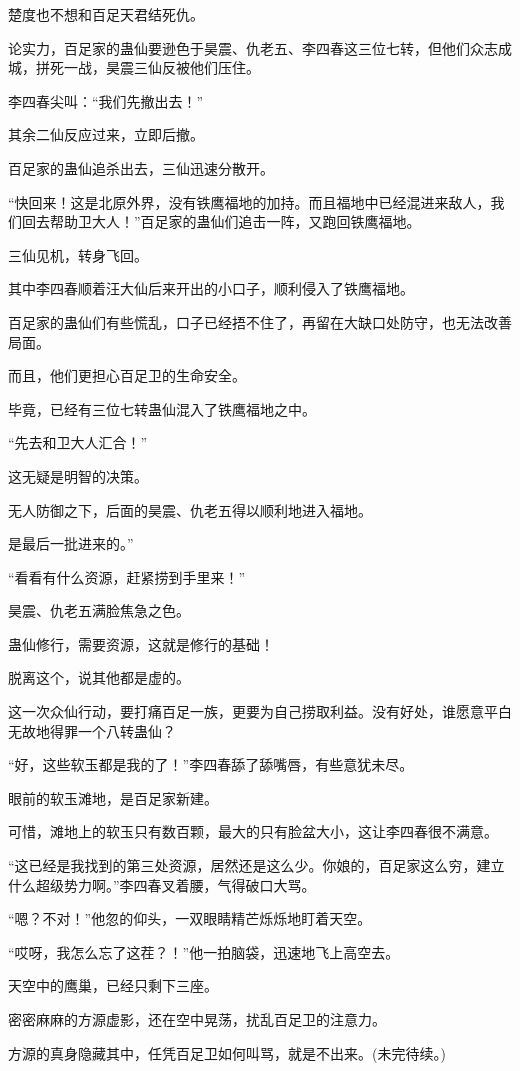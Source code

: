 \begin{this_body}
楚度也不想和百足天君结死仇。

论实力，百足家的蛊仙要逊色于昊震、仇老五、李四春这三位七转，但他们众志成城，拼死一战，昊震三仙反被他们压住。

李四春尖叫：“我们先撤出去！”

其余二仙反应过来，立即后撤。

百足家的蛊仙追杀出去，三仙迅速分散开。

“快回来！这是北原外界，没有铁鹰福地的加持。而且福地中已经混进来敌人，我们回去帮助卫大人！”百足家的蛊仙们追击一阵，又跑回铁鹰福地。

三仙见机，转身飞回。

其中李四春顺着汪大仙后来开出的小口子，顺利侵入了铁鹰福地。

百足家的蛊仙们有些慌乱，口子已经捂不住了，再留在大缺口处防守，也无法改善局面。

而且，他们更担心百足卫的生命安全。

毕竟，已经有三位七转蛊仙混入了铁鹰福地之中。

“先去和卫大人汇合！”

这无疑是明智的决策。

无人防御之下，后面的昊震、仇老五得以顺利地进入福地。

是最后一批进来的。”

“看看有什么资源，赶紧捞到手里来！”

昊震、仇老五满脸焦急之色。

蛊仙修行，需要资源，这就是修行的基础！

脱离这个，说其他都是虚的。

这一次众仙行动，要打痛百足一族，更要为自己捞取利益。没有好处，谁愿意平白无故地得罪一个八转蛊仙？

“好，这些软玉都是我的了！”李四春舔了舔嘴唇，有些意犹未尽。

眼前的软玉滩地，是百足家新建。

可惜，滩地上的软玉只有数百颗，最大的只有脸盆大小，这让李四春很不满意。

“这已经是我找到的第三处资源，居然还是这么少。你娘的，百足家这么穷，建立什么超级势力啊。”李四春叉着腰，气得破口大骂。

“嗯？不对！”他忽的仰头，一双眼睛精芒烁烁地盯着天空。

“哎呀，我怎么忘了这茬？！”他一拍脑袋，迅速地飞上高空去。

天空中的鹰巢，已经只剩下三座。

密密麻麻的方源虚影，还在空中晃荡，扰乱百足卫的注意力。

方源的真身隐藏其中，任凭百足卫如何叫骂，就是不出来。(未完待续。)


\end{this_body}
